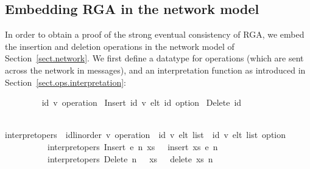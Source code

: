 \subsection{Embedding RGA in the network model}

In order to obtain a proof of the strong eventual consistency of RGA, we embed the insertion and deletion operations in the network model of Section~\ref{sect.network}.
We first define a datatype for operations (which are sent across the network in messages), and an interpretation function as introduced in Section~\ref{sect.ops.interpretation}:
\vspace{0.275em}
\begin{isabellebody}
\ \ \ \ \ \ \ \  {\isacharparenleft}{\isacharprime}id{\isacharcomma}\ {\isacharprime}v{\isacharparenright}\ operation\ {\isacharequal} Insert\ {\isachardoublequoteopen}{\isacharparenleft}{\isacharprime}id{\isacharcomma}\ {\isacharprime}v{\isacharparenright}\ elt{\isachardoublequoteclose}\ {\isachardoublequoteopen}{\isacharprime}id\ option{\isachardoublequoteclose}\ {\isacharbar} Delete\ {\isachardoublequoteopen}{\isacharprime}id{\isachardoublequoteclose}
\end{isabellebody}
\vspace{0.275em}
\begin{isabellebody}
\ \ \ \ \ \ \ \  interpret{\isacharunderscore}opers\ {\isacharcolon}{\isacharcolon}\ {\isachardoublequoteopen}{\isacharparenleft}{\isacharprime}id{\isacharcolon}{\isacharcolon}linorder{\isacharcomma}\ {\isacharprime}v{\isacharparenright}\ operation\ {\isasymRightarrow}\ {\isacharparenleft}{\isacharprime}id{\isacharcomma}\ {\isacharprime}v{\isacharparenright}\ elt\ list\ {\isasymRightarrow}\ {\isacharparenleft}{\isacharprime}id{\isacharcomma}\ {\isacharprime}v{\isacharparenright}\ elt\ list\ option{\isachardoublequoteclose}\ \isanewline
\ \ \ \ \ \ \ \ \ \ {\isachardoublequoteopen}interpret{\isacharunderscore}opers\ {\isacharparenleft}Insert\ e\ n{\isacharparenright}\ xs\ \ {\isacharequal}\ insert\ xs\ e\ n{\isachardoublequoteclose}\ {\isacharbar}\isanewline
\ \ \ \ \ \ \ \ \ \ {\isachardoublequoteopen}interpret{\isacharunderscore}opers\ {\isacharparenleft}Delete\ n{\isacharparenright}\ \ \ xs\ \ {\isacharequal}\ delete\ xs\ n{\isachardoublequoteclose}
\end{isabellebody}
\vspace{0.275em}

